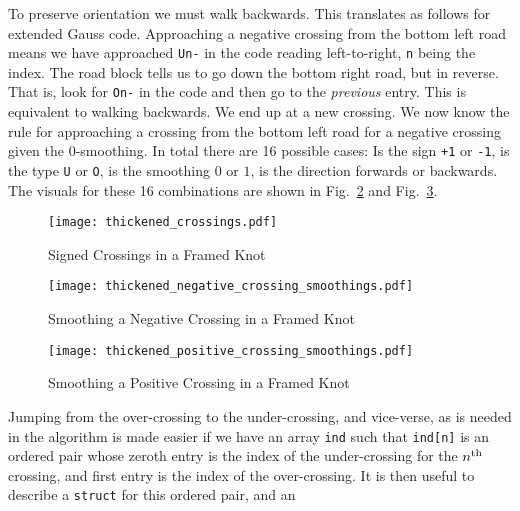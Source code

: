         To preserve orientation we must walk backwards. This translates as
        follows for extended Gauss code. Approaching a negative crossing from
        the bottom left road means we have approached \texttt{Un-} in
        the code reading left-to-right, \texttt{n} being the index. The
        road block tells us to go down the bottom right road, but in reverse.
        That is, look for \texttt{On-} in the code and then go
        to the \textit{previous} entry.
        This is equivalent to walking backwards. We end up at a new crossing.
        We now know the rule for approaching a crossing from the bottom left
        road for a negative crossing given the 0-smoothing. In total there are
        16 possible cases: Is the sign \texttt{+1} or \texttt{-1}, is the type
        \texttt{U} or \texttt{O}, is the smoothing $0$ or $1$,
        is the direction forwards or backwards. The
        visuals for these 16 combinations are shown in
        Fig.~\ref{fig:thickened_negative_crossing_smoothings} and
        Fig.~\ref{fig:thickened_positive_crossing_smoothings}.
        \par\hfill\par
        \begin{figure}
            \centering
            \texttt{[image: thickened\_crossings.pdf]}
            \caption{Signed Crossings in a Framed Knot}
            \label{fig:thickened_crossings}
        \end{figure}
        \begin{figure}
            \centering
            \texttt{[image: thickened\_negative\_crossing\_smoothings.pdf]}
            \caption{Smoothing a Negative Crossing in a Framed Knot}
            \label{fig:thickened_negative_crossing_smoothings}
        \end{figure}
        \begin{figure}
            \centering
            \texttt{[image: thickened\_positive\_crossing\_smoothings.pdf]}
            \caption{Smoothing a Positive Crossing in a Framed Knot}
            \label{fig:thickened_positive_crossing_smoothings}
        \end{figure}
        Jumping from the over-crossing to the under-crossing, and vice-verse,
        as is needed in the algorithm is made easier if we have an array
        \texttt{ind} such that \texttt{ind[n]} is an ordered pair whose
        zeroth entry is the index of the under-crossing for the
        $n^{\small\textrm{th}}$ crossing, and first entry is the index of the
        over-crossing. It is then
        useful to describe a \texttt{struct} for this ordered pair, and an
